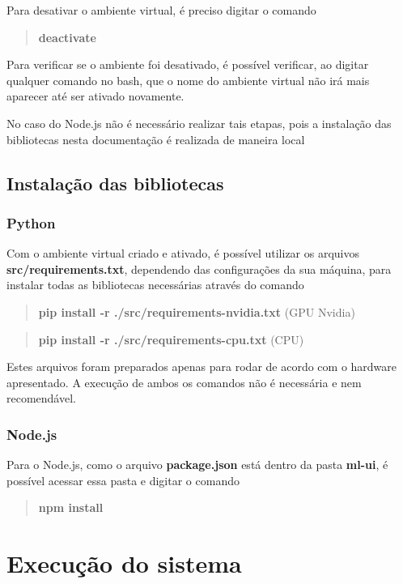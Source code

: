 \documentclass[portugues]{ic-tese}
\begin{document}
Para desativar o ambiente virtual, é preciso digitar o comando

\begin{quote}\textbf{deactivate}\end{quote}

Para verificar se o ambiente foi desativado, é possível verificar, ao digitar qualquer comando no bash, que o nome do ambiente virtual não irá mais aparecer até ser ativado novamente.

No caso do Node.js não é necessário realizar tais etapas, pois a instalação das bibliotecas nesta documentação é realizada de maneira local

\subsection{Instalação das bibliotecas}

\subsubsection{Python}

Com o ambiente virtual criado e ativado, é possível utilizar os arquivos \textbf{src/requirements.txt}, dependendo das configurações da sua máquina, para instalar todas as bibliotecas necessárias através do comando

\begin{quote}\textbf{pip install -r ./src/requirements-nvidia.txt} (GPU Nvidia)\end{quote}
\begin{quote}\textbf{pip install -r ./src/requirements-cpu.txt} (CPU)\end{quote}

Estes arquivos foram preparados apenas para rodar de acordo com o hardware apresentado. A execução de ambos os comandos não é necessária e nem recomendável.

\subsubsection{Node.js}

Para o Node.js, como o arquivo \textbf{package.json} está dentro da pasta \textbf{ml-ui}, é possível acessar essa pasta e digitar o comando

\begin{quote}\textbf{npm install}\end{quote}

\section{Execução do sistema}
\end{document}
